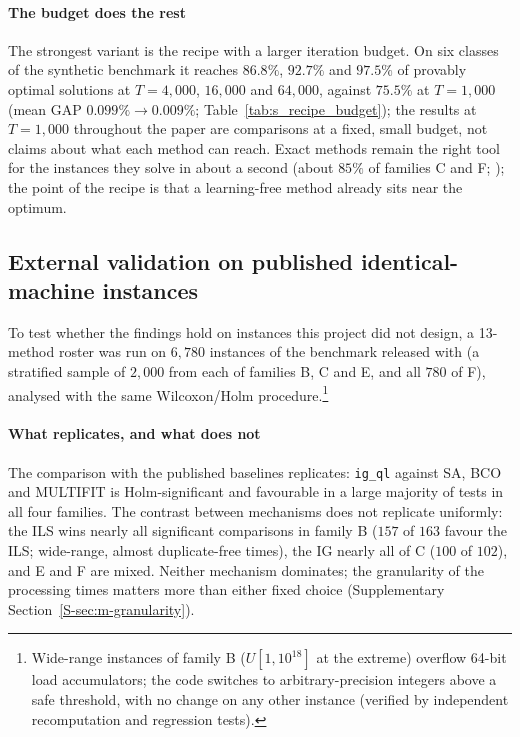 \paragraph{The budget does the rest}
The strongest variant is the recipe with a larger iteration budget. On six classes of the synthetic benchmark it reaches $86.8\%$, $92.7\%$ and $\mathbf{97.5\%}$ of provably optimal solutions at $T=4{,}000$,
$16{,}000$ and $64{,}000$, against $75.5\%$ at $T=1{,}000$ (mean GAP $0.099\%\to0.009\%$; Table~\ref{tab:s_recipe_budget}); the results at $T=1{,}000$ throughout the paper are comparisons at a fixed, small
budget, not claims about what each method can reach. Exact methods remain the right tool for the instances they solve in about a second (about $85\%$ of families C and F; \citealp{OstojicEtAl2025}); the point
of the recipe is that a learning-free method already sits near the optimum.



\subsection{External validation on published identical-machine instances}
\label{sec:external}

To test whether the findings hold on instances this project did not design, a 13-method roster was run on $6{,}780$ instances of the benchmark released with \citet{OstojicEtAl2025} (a stratified sample of $2{,}000$ from
each of families B, C and E, and all $780$ of F), analysed with the same Wilcoxon/Holm procedure.\footnote{Wide-range instances of family B ($U[1,10^{18}]$ at the extreme) overflow 64-bit load accumulators; the code
switches to arbitrary-precision integers above a safe threshold, with no change on any other instance (verified by independent recomputation and regression tests).}

\paragraph{What replicates, and what does not}
The comparison with the published baselines replicates: \texttt{ig\_ql} against SA, BCO and MULTIFIT is Holm-significant and favourable in a large majority of tests in all four families. The contrast between
mechanisms does not replicate uniformly: the ILS wins nearly all significant comparisons in family B ($157$ of $163$ favour the ILS; wide-range, almost duplicate-free times), the IG nearly all of C ($100$ of $102$), and
E and F are mixed. Neither mechanism dominates; the granularity of the processing times matters more than either fixed choice (Supplementary Section~\ref{S-sec:m-granularity}).

